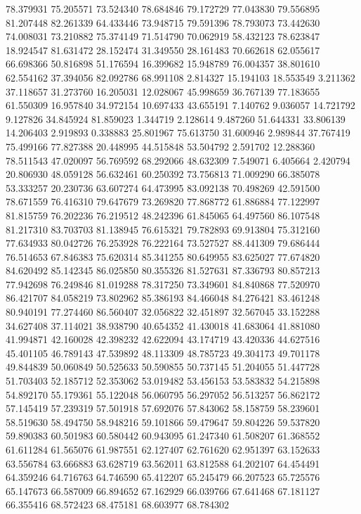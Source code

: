 78.379931
75.205571
73.524340
78.684846
79.172729
77.043830
79.556895
81.207448
82.261339
64.433446
73.948715
79.591396
78.793073
73.442630
74.008031
73.210882
75.374149
71.514790
70.062919
58.432123
78.623847
18.924547
81.631472
28.152474
31.349550
28.161483
70.662618
62.055617
66.698366
50.816898
51.176594
16.399682
15.948789
76.004357
38.801610
62.554162
37.394056
82.092786
68.991108
2.814327
15.194103
18.553549
3.211362
37.118657
31.273760
16.205031
12.028067
45.998659
36.767139
77.183655
61.550309
16.957840
34.972154
10.697433
43.655191
7.140762
9.036057
14.721792
9.127826
34.845924
81.859023
1.344719
2.128614
9.487260
51.644331
33.806139
14.206403
2.919893
0.338883
25.801967
75.613750
31.600946
2.989844
37.767419
75.499166
77.827388
20.448995
44.515848
53.504792
2.591702
12.288360
78.511543
47.020097
56.769592
68.292066
48.632309
7.549071
6.405664
2.420794
20.806930
48.059128
56.632461
60.250392
73.756813
71.009290
66.385078
53.333257
20.230736
63.607274
64.473995
83.092138
70.498269
42.591500
78.671559
76.416310
79.647679
73.269820
77.868772
61.886884
77.122997
81.815759
76.202236
76.219512
48.242396
61.845065
64.497560
86.107548
81.217310
83.703703
81.138945
76.615321
79.782893
69.913804
75.312160
77.634933
80.042726
76.253928
76.222164
73.527527
88.441309
79.686444
76.514653
67.846383
75.620314
85.341255
80.649955
83.625027
77.674820
84.620492
85.142345
86.025850
80.355326
81.527631
87.336793
80.857213
77.942698
76.249846
81.019288
78.317250
73.349601
84.840868
77.520970
86.421707
84.058219
73.802962
85.386193
84.466048
84.276421
83.461248
80.940191
77.274460
86.560407
32.056822
32.451897
32.567045
33.152288
34.627408
37.114021
38.938790
40.654352
41.430018
41.683064
41.881080
41.994871
42.160028
42.398232
42.622094
43.174719
43.420336
44.627516
45.401105
46.789143
47.539892
48.113309
48.785723
49.304173
49.701178
49.844839
50.060849
50.525633
50.590855
50.737145
51.204055
51.447728
51.703403
52.185712
52.353062
53.019482
53.456153
53.583832
54.215898
54.892170
55.179361
55.122048
56.060795
56.297052
56.513257
56.862172
57.145419
57.239319
57.501918
57.692076
57.843062
58.158759
58.239601
58.519630
58.494750
58.948216
59.101866
59.479647
59.804226
59.537820
59.890383
60.501983
60.580442
60.943095
61.247340
61.508207
61.368552
61.611284
61.565076
61.987551
62.127407
62.761620
62.951397
63.152633
63.556784
63.666883
63.628719
63.562011
63.812588
64.202107
64.454491
64.359246
64.716763
64.746590
65.412207
65.245479
66.207523
65.725576
65.147673
66.587009
66.894652
67.162929
66.039766
67.641468
67.181127
66.355416
68.572423
68.475181
68.603977
68.784302
